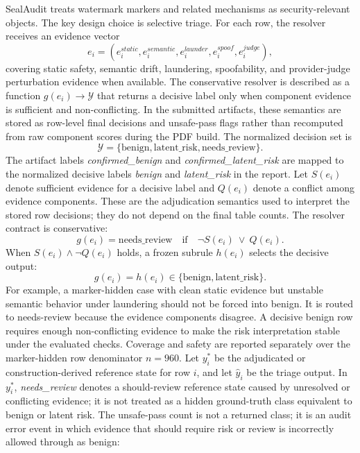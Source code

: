 SealAudit treats watermark markers and related mechanisms as security-relevant objects. The key design choice is selective triage. For each row, the resolver receives an evidence vector
\begin{equation}
  e_i=(e^{static}_i,e^{semantic}_i,e^{launder}_i,e^{spoof}_i,e^{judge}_i),
\end{equation}
covering static safety, semantic drift, laundering, spoofability, and provider-judge perturbation evidence when available. The conservative resolver is described as a function $g(e_i)\rightarrow \mathcal{Y}$ that returns a decisive label only when component evidence is sufficient and non-conflicting. In the submitted artifacts, these semantics are stored as row-level final decisions and unsafe-pass flags rather than recomputed from raw component scores during the PDF build. The normalized decision set is
\begin{equation}
  \mathcal{Y} = \{\mathrm{benign}, \mathrm{latent\_risk}, \mathrm{needs\_review}\}.
\end{equation}
The artifact labels \emph{confirmed\_benign} and \emph{confirmed\_latent\_risk} are mapped to the normalized decisive labels \emph{benign} and \emph{latent\_risk} in the report. Let $S(e_i)$ denote sufficient evidence for a decisive label and $Q(e_i)$ denote a conflict among evidence components. These are the adjudication semantics used to interpret the stored row decisions; they do not depend on the final table counts. The resolver contract is conservative:
\begin{equation}
  g(e_i)=\mathrm{needs\_review}
  \quad\text{if}\quad
  \neg S(e_i)\ \vee\ Q(e_i).
\end{equation}
When $S(e_i)\wedge\neg Q(e_i)$ holds, a frozen subrule $h(e_i)$ selects the decisive output:
\begin{equation}
  g(e_i)=h(e_i)\in\{\mathrm{benign},\mathrm{latent\_risk}\}.
\end{equation}
For example, a marker-hidden case with clean static evidence but unstable semantic behavior under laundering should not be forced into benign. It is routed to needs-review because the evidence components disagree. A decisive benign row requires enough non-conflicting evidence to make the risk interpretation stable under the evaluated checks.
Coverage and safety are reported separately over the marker-hidden row denominator $n=960$. Let $y_i^\ast$ be the adjudicated or construction-derived reference state for row $i$, and let $\hat{y}_i$ be the triage output. In $y_i^\ast$, \emph{needs\_review} denotes a should-review reference state caused by unresolved or conflicting evidence; it is not treated as a hidden ground-truth class equivalent to benign or latent risk. The unsafe-pass count is not a returned class; it is an audit error event in which evidence that should require risk or review is incorrectly allowed through as benign:

